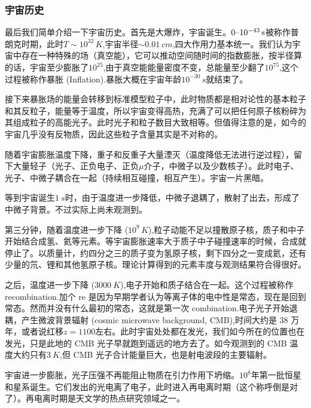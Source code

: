 \documentclass[../天体物理基础.tex]{subfiles}
\begin{document}
\subsubsection{宇宙历史}
最后我们简单介绍一下宇宙历史。首先是大爆炸，宇宙诞生。$0\text{\textendash}10^{-43}\,\unit{s}$被称作普朗克时期，此时$T\sim10^{32}\,\unit{K}$,宇宙半径$\sim\qty{0.01}{cm}$,四大作用力基本统一。我们认为宇宙中存在一种特殊的场（真空能），它可以推动空间随时间的指数膨胀，按半径算的话，宇宙至少膨胀了$10^{25}$,由于真空能能量密度不变，总能量至少翻了$10^{75}$,这个过程被称作暴胀 (Inflation).暴胀大概在宇宙年龄$10^{-30}\,\unit{s}$就结束了。

接下来暴胀场的能量会转移到标准模型粒子中，此时物质都是相对论性的基本粒子和其反粒子，能量等于温度，所以宇宙变得高热，充满了可以把任何原子核粉碎为其组成粒子的高能光子。此时光子和粒子数目大致相等。但值得注意的是，如今的宇宙几乎没有反物质，因此这些粒子含量其实是不对称的。

随着宇宙膨胀温度下降，重子和反重子大量湮灭（温度降低无法进行逆过程），留下大量轻子（光子、正负电子、正负$\mu$介子，中微子以及少数核子）。此时电子、光子、中微子耦合在一起（持续相互碰撞，相互产生）。宇宙一片黑暗。

等到宇宙诞生$\qty{1}{s}$时，由于温度进一步降低，中微子退耦了，散射了出去，形成了中微子背景。不过实际上尚未观测到。

第三分钟，随着温度进一步下降 ($10^{9}\,\unit{K}$),粒子动能不足以撞散原子核，质子和中子开始结合成氢、氦等元素。等宇宙膨胀速率大于质子中子碰撞速率的时候，合成就停止了。以质量计，约四分之三的质子变为氢原子核，剩下四分之一变成氦，还有少量的氘、锂和其他氢原子核。理论计算得到的元素丰度与观测结果符合得很好。

之后，温度进一步下降 ($\qty{3000}{K}$),电子开始和质子结合在一起。这个过程被称作 recombination.加个 re 是因为早期学者认为等离子体的电中性是常态，现在是回到常态。然而并没有什么最初的常态，这就是第一次 combination.电子光子开始退耦，产生微波背景辐射 (cosmic microwave background, CMB),时间大约是 38 万年，或者说红移$z=1100$左右。此时宇宙处处都在发光，我们如今所在的位置也在发光，只是此地的 CMB 光子早就跑到遥远的地方去了。如今观测到的 CMB 温度大约只有$\qty{3}{K}$,但 CMB 光子合计能量巨大，也是射电波段的主要辐射。

宇宙进一步膨胀，光子压强不再能阻止物质在引力作用下坍缩。$10^{8}$年第一批恒星和星系诞生。它们发出的光电离了电子，此时进入再电离时期（这个称呼倒是对了）。再电离时期是天文学的热点研究领域之一。
\end{document}
